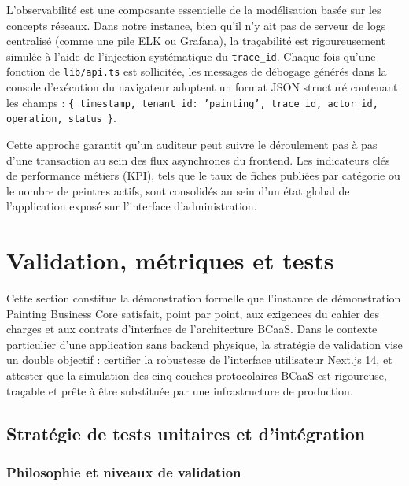 \documentclass[12pt,a4paper]{report}
\begin{document}
L'observabilité est une composante essentielle de la modélisation basée sur les concepts réseaux. Dans notre instance, bien qu'il n'y ait pas de serveur de logs centralisé (comme une pile ELK ou Grafana), la traçabilité est rigoureusement simulée à l'aide de l'injection systématique du \texttt{trace\_id}. Chaque fois qu'une fonction de \texttt{lib/api.ts} est sollicitée, les messages de débogage générés dans la console d'exécution du navigateur adoptent un format JSON structuré contenant les champs : \texttt{\{ timestamp, tenant\_id: 'painting', trace\_id, actor\_id, operation, status \}}.

Cette approche garantit qu'un auditeur peut suivre le déroulement pas à pas d'une transaction au sein des flux asynchrones du frontend. Les indicateurs clés de performance métiers (KPI), tels que le taux de fiches publiées par catégorie ou le nombre de peintres actifs, sont consolidés au sein d'un état global de l'application exposé sur l'interface d'administration.

\newpage
\section{Validation, métriques et tests}

Cette section constitue la démonstration formelle que l'instance de démonstration Painting Business Core satisfait, point par point, aux exigences du cahier des charges et aux contrats d'interface de l'architecture BCaaS. Dans le contexte particulier d'une application sans backend physique, la stratégie de validation vise un double objectif : certifier la robustesse de l'interface utilisateur Next.js 14, et attester que la simulation des cinq couches protocolaires BCaaS est rigoureuse, traçable et prête à être substituée par une infrastructure de production.

\subsection{Stratégie de tests unitaires et d'intégration}

\subsubsection*{Philosophie et niveaux de validation}
\end{document}
